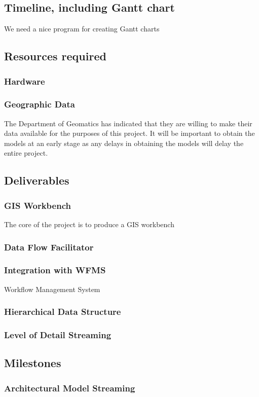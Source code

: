 \documentclass[12pt,a4paper]{article}
\begin{document}
\subsection{Timeline, including Gantt chart}
We need a nice program for creating Gantt charts
\subsection{Resources required}
\subsubsection*{Hardware}
\subsubsection*{Geographic Data}
The Department of Geomatics has indicated that they are willing to make their data available for the purposes of this project. It will be important to obtain the models at an early stage as any delays in obtaining the models will delay the entire project.
\subsection{Deliverables}
\subsubsection{GIS Workbench}
The core of the project is to produce a GIS workbench
\subsubsection{Data Flow Facilitator}
\subsubsection{Integration with WFMS}
Workflow Management System
\subsubsection{Hierarchical Data Structure}
\subsubsection{Level of Detail Streaming}
\subsection{Milestones}
\subsubsection{Architectural Model Streaming}
\end{document}
